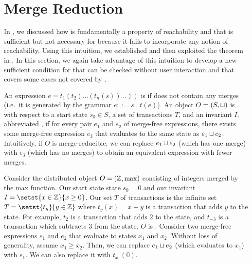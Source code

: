 \section{Merge Reduction}
In , we discussed how \invariantconfluence{} is
fundamentally a property of reachability and that \invariantclosure{} is
sufficient but not necessary for \invariantconfluence{} because it fails to
incorporate any notion of reachability. Using this intuition, we established
 and then exploited the theorem in
. In this section, we again take
advantage of this intuition to develop a new sufficient condition for
\invariantconfluence{} that can be checked without user interaction and that
covers some cases not covered by \invariantclosure{}.

An expression $e = t_1(t_2(\ldots(t_n(s))\ldots))$ is  if
does not contain any merges (i.e.\ it is generated by the grammar $e ::= s \mid
t(e)$). An object $O = (S, \sqcup)$ is  with respect to
a start state $s_0 \in S$, a set of transactions $T$, and an invariant $I$,
abbreviated , if for every pair $e_1$ and $e_2$ of
merge-free \sTIreachable{} expressions, there exists some merge-free
\sTIreachable{} expression $e_3$ that evaluates to the same state as $e_1 \sqcup
e_2$. Intuitively, if $O$ is merge-reducible, we can replace $e_1 \sqcup e_2$
(which has one merge) with $e_3$ (which has no merges) to obtain an equivalent
expression with fewer merges.

\begin{example}
  Consider the distributed object $O = (\mathbb{Z}, \max)$ consisting of integers
  merged by the max function. Our start state state $s_0 = 0$ and our invariant
  $I = \setst{x \in \ints}{x \geq 0}$. Our set $T$ of transactions is the
  infinite set $T = \setst{t_y}{y \in \ints}$ where $t_y(x) = x + y$ is a
  transaction that adds $y$ to the state. For example, $t_2$ is a transaction
  that adds $2$ to the state, and $t_{-3}$ is a transaction which subtracts $3$
  from the state.
  $O$ is \sTImergereducible{}. Consider two merge-free \sTIreachable{}
  expressions $e_1$ and $e_2$ that evaluate to states $x_1$ and $x_2$. Without
  loss of generality, assume $x_1 \geq x_2$. Then, we can replace $e_1 \sqcup
  e_2$ (which evaluates to $x_1$) with $e_1$. We can also replace it with
  $t_{x_1}(0)$.
\end{example}

